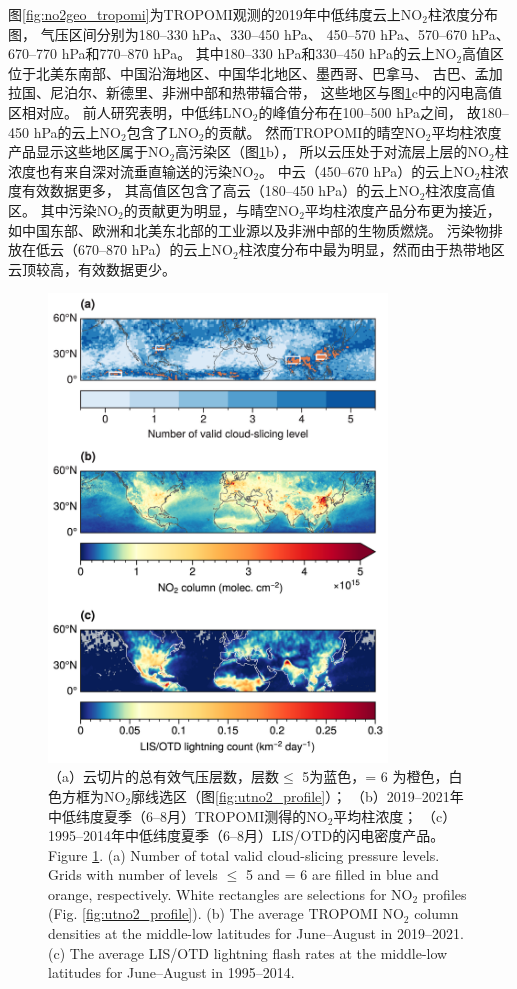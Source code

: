 图\ref{fig:no2geo_tropomi}为TROPOMI观测的2019年中低纬度云上NO$_2$柱浓度分布图，
气压区间分别为180--330 hPa、330--450 hPa、
450--570 hPa、570--670 hPa、670--770 hPa和770--870 hPa。
其中180--330 hPa和330--450 hPa的云上NO$_2$高值区位于北美东南部、中国沿海地区、中国华北地区、墨西哥、巴拿马、
古巴、孟加拉国、尼泊尔、新德里、非洲中部和热带辐合带，
这些地区与图\ref{fig:no2_ltngcount}c中的闪电高值区相对应。
前人研究表明，中低纬LNO$_2$的峰值分布在100--500 hPa之间\citep{Pickering.1988,Ott.2010,Luo.2017}，
故180--450 hPa的云上NO$_2$包含了LNO$_2$的贡献。
然而TROPOMI的晴空NO$_2$平均柱浓度产品显示这些地区属于NO$_2$高污染区（图\ref{fig:no2_ltngcount}b），
所以云压处于对流层上层的NO$_2$柱浓度也有来自深对流垂直输送的污染NO$_2$。
中云（450--670 hPa）的云上NO$_2$柱浓度有效数据更多，
其高值区包含了高云（180--450 hPa）的云上NO$_2$柱浓度高值区。
其中污染NO$_2$的贡献更为明显，与晴空NO$_2$平均柱浓度产品分布更为接近，
如中国东部、欧洲和北美东北部的工业源以及非洲中部的生物质燃烧。
污染物排放在低云（670--870 hPa）的云上NO$_2$柱浓度分布中最为明显，然而由于热带地区云顶较高，有效数据更少。


\begin{figure}[H]
    \centering
    \includegraphics[width=9cm]{./figures/no2_ltngcount.png}
    \caption{
    （a）云切片的总有效气压层数，层数$\leq$ 5为蓝色，= 6 为橙色，白色方框为NO$_2$廓线选区（图\ref{fig:utno2_profile}）；
    （b）2019--2021年中低纬度夏季（6--8月）TROPOMI测得的NO$_2$平均柱浓度；
    （c）1995--2014年中低纬度夏季（6--8月）LIS/OTD的闪电密度产品。 \\
    Figure \ref{fig:no2_ltngcount}. (a) Number of total valid cloud-slicing pressure levels.
    Grids with number of levels $\leq$ 5 and = 6 are filled in blue and orange, respectively.
    White rectangles are selections for NO$_2$ profiles (Fig. \ref{fig:utno2_profile}).
    (b) The average TROPOMI NO$_2$ column densities at the middle-low latitudes for June--August in 2019--2021.
    (c) The average LIS/OTD lightning flash rates at the middle-low latitudes for June--August in 1995--2014.
    }
    \label{fig:no2_ltngcount}
\end{figure}

